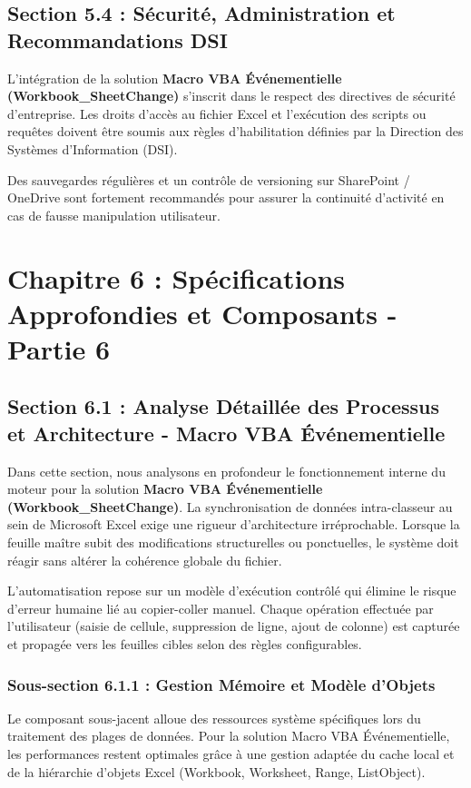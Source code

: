 \documentclass[12pt,a4paper]{report}
\begin{document}
\section{Section 5.4 : Sécurité, Administration et Recommandations DSI}
L'intégration de la solution \textbf{Macro VBA Événementielle (Workbook\_SheetChange)} s'inscrit dans le respect des directives de sécurité d'entreprise. Les droits d'accès au fichier Excel et l'exécution des scripts ou requêtes doivent être soumis aux règles d'habilitation définies par la Direction des Systèmes d'Information (DSI).

Des sauvegardes régulières et un contrôle de versioning sur SharePoint / OneDrive sont fortement recommandés pour assurer la continuité d'activité en cas de fausse manipulation utilisateur.


\chapter{Chapitre 6 : Spécifications Approfondies et Composants - Partie 6}

\section{Section 6.1 : Analyse Détaillée des Processus et Architecture - Macro VBA Événementielle}
Dans cette section, nous analysons en profondeur le fonctionnement interne du moteur pour la solution \textbf{Macro VBA Événementielle (Workbook\_SheetChange)}. La synchronisation de données intra-classeur au sein de Microsoft Excel exige une rigueur d'architecture irréprochable. Lorsque la feuille maître subit des modifications structurelles ou ponctuelles, le système doit réagir sans altérer la cohérence globale du fichier.

L'automatisation repose sur un modèle d'exécution contrôlé qui élimine le risque d'erreur humaine lié au copier-coller manuel. Chaque opération effectuée par l'utilisateur (saisie de cellule, suppression de ligne, ajout de colonne) est capturée et propagée vers les feuilles cibles selon des règles configurables.


\subsection{Sous-section 6.1.1 : Gestion Mémoire et Modèle d'Objets}
Le composant sous-jacent alloue des ressources système spécifiques lors du traitement des plages de données. Pour la solution Macro VBA Événementielle, les performances restent optimales grâce à une gestion adaptée du cache local et de la hiérarchie d'objets Excel (Workbook, Worksheet, Range, ListObject).
\end{document}
